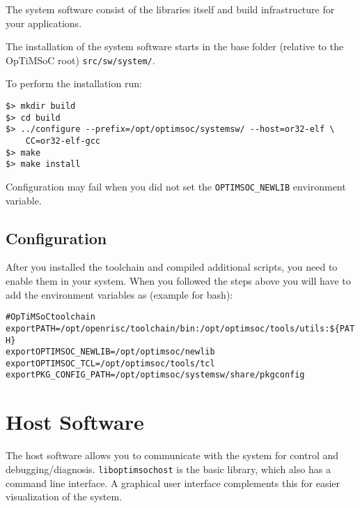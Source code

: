 The system software consist of the libraries itself and build
infrastructure for your applications.

The installation of the system software starts in the base folder
(relative to the OpTiMSoC root) \verb|src/sw/system/|.




To perform the installation run:

\begin{verbatim}
$> mkdir build
$> cd build
$> ../configure --prefix=/opt/optimsoc/systemsw/ --host=or32-elf \
    CC=or32-elf-gcc
$> make
$> make install
\end{verbatim}

Configuration may fail when you did not set the \verb|OPTIMSOC_NEWLIB|
environment variable.

\subsection{Configuration}

After you installed the toolchain and compiled additional scripts, you
need to enable them in your system. When you followed the steps above
you will have to add the environment variables as (example for bash):

\begin{alltt}
# OpTiMSoC toolchain
export PATH=/opt/openrisc/toolchain/bin:/opt/optimsoc/tools/utils:\$\{PATH\}
export OPTIMSOC_NEWLIB=/opt/optimsoc/newlib
export OPTIMSOC_TCL=/opt/optimsoc/tools/tcl
export PKG_CONFIG_PATH=/opt/optimsoc/systemsw/share/pkgconfig
\end{alltt}

\section{Host Software}

The host software allows you to communicate with the system for
control and debugging/diagnosis. \verb|liboptimsochost| is the basic
library, which also has a command line interface. A graphical user
interface complements this for easier visualization of the system.


